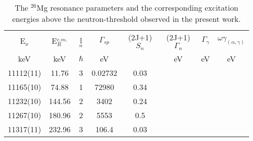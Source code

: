 \begin{landscape}
\setlength{\capwidth}{0.7\textwidth}

    \begin{table}[tpb]
        \begin{centering}
        \caption{ The $^{26}$Mg resonance parameters and the corresponding excitation energies above the neutron-threshold observed in the present work. }
        \label{tb:reaction_parameters}
    \begin{tabular}{c c c c c c c c }
    \toprule
    \toprule
    E$_x$   &       E$_R^{c.m.}$&   l$_n$    &   $\Gamma_{sp}$   &   (2J+1)$S_n$ &  (2J+1)$\Gamma_n$    &  $\Gamma_\gamma$ & $\omega\gamma_{(\alpha,\gamma)}$    \\
    keV     &       keV         &   $\hbar$  &   eV              &               &  eV                  &   eV        &          eV       \\
 \hline
    11112(11)  &     11.76      &    3        &   0.02732         &      0.03        &                      &             &                               \\
    11165(10)  &     74.88      &    1        &   72980           &      0.34        &                      &             &                               \\
    11232(10)  &     144.56    &    2       &   3402              &      0.24        &                      &             &                               \\
    11267(10)  &     180.96    &    2       &  5553               &      0.5         &                      &             &                               \\
    11317(11)  &     232.96    &    3       &  106.4              &       0.03       &                      &             &                               \\



        \hline
     \end{tabular}
      \end{centering}
    \end{table}

\end{landscape}